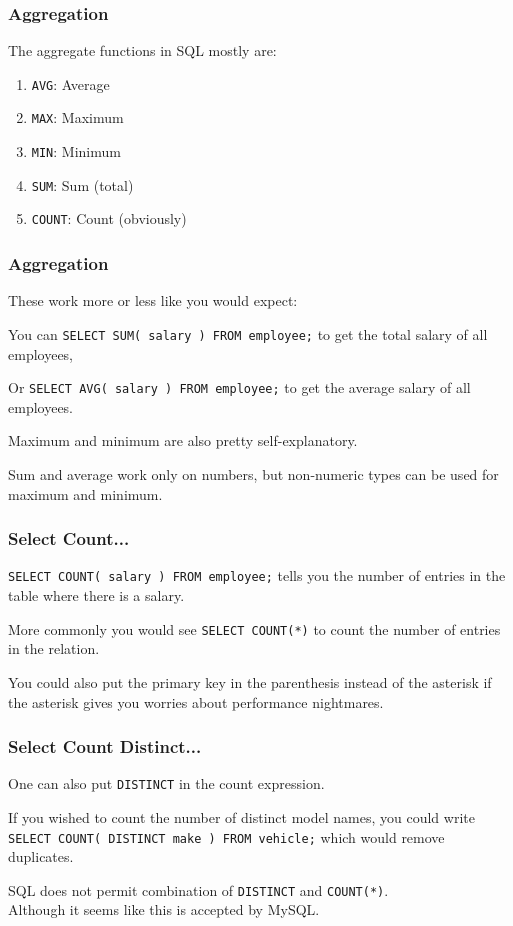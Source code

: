 \begin{frame}
\frametitle{Aggregation}

The aggregate functions in SQL mostly are:
\begin{enumerate}
	\item \texttt{AVG}: Average 
	\item \texttt{MAX}: Maximum
	\item \texttt{MIN}: Minimum
	\item \texttt{SUM}: Sum (total)
	\item \texttt{COUNT}: Count (obviously)
\end{enumerate}


\end{frame}



\begin{frame}
\frametitle{Aggregation}

These work more or less like you would expect: 

You can \texttt{SELECT SUM( salary ) FROM employee;} to get the total salary of all employees, 

Or \texttt{SELECT AVG( salary ) FROM employee;} to get the average salary of all employees.

Maximum and minimum are also pretty self-explanatory. 

Sum and average work only on numbers, but non-numeric types can be used for maximum and minimum. 

\end{frame}


\begin{frame}
\frametitle{Select Count...}

\texttt{SELECT COUNT( salary ) FROM employee;} tells you the number of entries in the table where there is a salary. 

More commonly you would see \texttt{SELECT COUNT(*)} to count the number of entries in the relation.

You could also put the primary key in the parenthesis instead of the asterisk if the asterisk gives you worries about performance nightmares.


\end{frame}



\begin{frame}
\frametitle{Select Count Distinct...}

One can also put \texttt{DISTINCT} in the count expression. 

If you wished to count the number of distinct model names, you could write \texttt{SELECT COUNT( DISTINCT make ) FROM vehicle;} which would remove duplicates.

SQL does not permit combination of \texttt{DISTINCT} and \texttt{COUNT(*)}.\\ \quad Although it seems like this is accepted by MySQL.

\end{frame}



